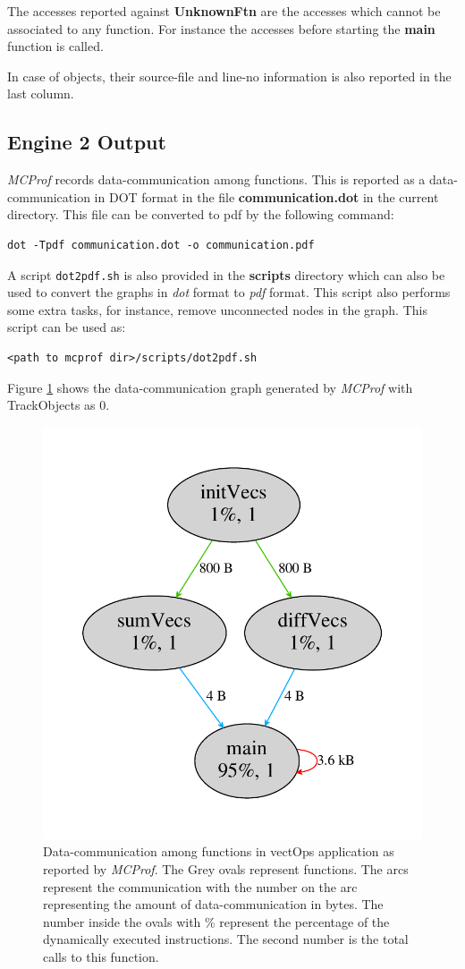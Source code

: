 \documentclass[10pt]{article}
\newcommand{\MCPROF}{\emph{MCProf}}
\begin{document}
The accesses reported against \textbf{UnknownFtn} are the accesses which cannot
be associated to any function. For instance the accesses before starting the
\textbf{main} function is called.

In case of objects, their source-file and line-no information is also reported in
the last column.

\subsection{Engine 2 Output}

\MCPROF{} records data-communication among functions. This is reported as a
data-communication in DOT format in the file \textbf{communication.dot} in the
current directory. This file can be converted to pdf by the following command:

{
\small
\begin{Verbatim}[frame=single]
dot -Tpdf communication.dot -o communication.pdf
\end{Verbatim}
}

A script \verb|dot2pdf.sh| is also provided in the \textbf{scripts} directory which can
also be used to convert the graphs in \emph{dot} format to \emph{pdf} format. This script
also performs some extra tasks, for instance, remove unconnected nodes in the
graph. This script can be used as:

{
\small
\begin{Verbatim}[frame=single]
<path to mcprof dir>/scripts/dot2pdf.sh
\end{Verbatim}
}

Figure \ref{fig:comm} shows the data-communication graph generated by \MCPROF{}
with TrackObjects as 0.

\begin{figure}[!h]
\centering
\includegraphics[width=0.55\linewidth]{figures/comm.pdf}
\caption{Data-communication among functions in vectOps application as reported
    by \MCPROF{}. The Grey ovals represent functions. The arcs represent the
    communication with the number on the arc representing the amount of
    data-communication in bytes. The number inside the ovals with \% represent
    the percentage of the dynamically executed instructions. The second number
    is the total calls to this function.}
\label{fig:comm}
\end{figure}
\end{document}
